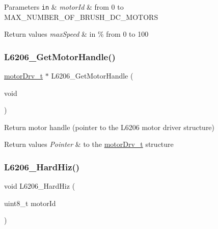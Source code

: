 \begin{DoxyParams}[1]{Parameters}
\mbox{\tt in}  & {\em motor\+Id} & from 0 to M\+A\+X\+\_\+\+N\+U\+M\+B\+E\+R\+\_\+\+O\+F\+\_\+\+B\+R\+U\+S\+H\+\_\+\+D\+C\+\_\+\+M\+O\+T\+O\+RS \\
\hline
\end{DoxyParams}

\begin{DoxyRetVals}{Return values}
{\em max\+Speed} & in \% from 0 to 100 \\
\hline
\end{DoxyRetVals}
\mbox{\label{group___l6206___exported___functions_gaa149792f903cf325f24d8d4488d6c1c4}} 
\subsubsection{\texorpdfstring{L6206\+\_\+\+Get\+Motor\+Handle()}{L6206\_GetMotorHandle()}}
{\footnotesize\ttfamily \mbox{\hyperlink{structmotor_drv__t}{motor\+Drv\+\_\+t}} $\ast$ L6206\+\_\+\+Get\+Motor\+Handle (\begin{DoxyParamCaption}\item[{void}]{ }\end{DoxyParamCaption})}



Return motor handle (pointer to the L6206 motor driver structure) 


\begin{DoxyRetVals}{Return values}
{\em Pointer} & to the \mbox{\hyperlink{structmotor_drv__t}{motor\+Drv\+\_\+t}} structure \\
\hline
\end{DoxyRetVals}
\mbox{\label{group___l6206___exported___functions_gaf6831d9247cb27710fd2e4b782e3e4b7}} 
\subsubsection{\texorpdfstring{L6206\+\_\+\+Hard\+Hiz()}{L6206\_HardHiz()}}
{\footnotesize\ttfamily void L6206\+\_\+\+Hard\+Hiz (\begin{DoxyParamCaption}\item[{uint8\+\_\+t}]{motor\+Id }\end{DoxyParamCaption})}



